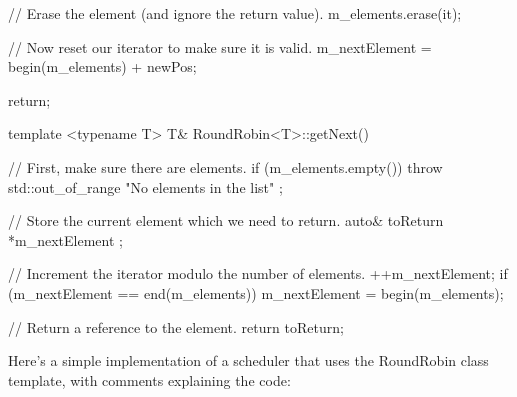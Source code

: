 \begin{cpp}
{{{                // Erase the element (and ignore the return value).
                m_elements.erase(it);

                // Now reset our iterator to make sure it is valid.
                m_nextElement = begin(m_elements) + newPos;

                return;
            }
        }
    }
template <typename T> T& RoundRobin<T>::getNext()
{
    // First, make sure there are elements.
    if (m_elements.empty()) {
        throw std::out_of_range { "No elements in the list" };
    }

    // Store the current element which we need to return.
    auto& toReturn { *m_nextElement };

    // Increment the iterator modulo the number of elements.
    ++m_nextElement;
    if (m_nextElement == end(m_elements)) { m_nextElement = begin(m_elements); }

    // Return a reference to the element.
    return toReturn;
}
\end{cpp}

Here’s a simple implementation of a scheduler that uses the RoundRobin class template, with comments explaining the code:

